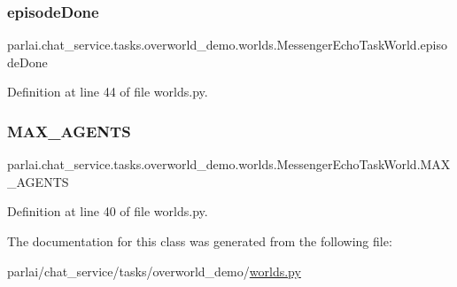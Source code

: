 \subsubsection{\texorpdfstring{episode\+Done}{episodeDone}}
{\footnotesize\ttfamily parlai.\+chat\+\_\+service.\+tasks.\+overworld\+\_\+demo.\+worlds.\+Messenger\+Echo\+Task\+World.\+episode\+Done}



Definition at line 44 of file worlds.\+py.

\mbox{\label{classparlai_1_1chat__service_1_1tasks_1_1overworld__demo_1_1worlds_1_1MessengerEchoTaskWorld_a5c39c68fabb3d7ffcabf02d40ba5c5e0}} 
\subsubsection{\texorpdfstring{M\+A\+X\+\_\+\+A\+G\+E\+N\+TS}{MAX\_AGENTS}}
{\footnotesize\ttfamily parlai.\+chat\+\_\+service.\+tasks.\+overworld\+\_\+demo.\+worlds.\+Messenger\+Echo\+Task\+World.\+M\+A\+X\+\_\+\+A\+G\+E\+N\+TS\hspace{0.3cm}{\ttfamily [static]}}



Definition at line 40 of file worlds.\+py.



The documentation for this class was generated from the following file\+:\begin{DoxyCompactItemize}
\item 
parlai/chat\+\_\+service/tasks/overworld\+\_\+demo/\hyperlink{parlai_2chat__service_2tasks_2overworld__demo_2worlds_8py}{worlds.\+py}\end{DoxyCompactItemize}
